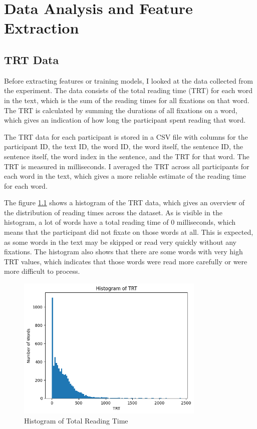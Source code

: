 \chapter{Data Analysis and Feature Extraction}

\section{TRT Data}
Before extracting features or training models, I looked at the data collected from the experiment. The data consists of the total reading time (TRT) for each word in the text, which is the sum of the reading times for all fixations on that word. The TRT is calculated by summing the durations of all fixations on a word, which gives an indication of how long the participant spent reading that word.

The TRT data for each participant is stored in a CSV file with columns for the participant ID, the text ID, the word ID, the word itself, the sentence ID, the sentence itself, the word index in the sentence, and the TRT for that word. The TRT is measured in milliseconds. I averaged the TRT across all participants for each word in the text, which gives a more reliable estimate of the reading time for each word. 

The figure \ref{fig:trt_data} shows a histogram of the TRT data, which gives an overview of the distribution of reading times across the dataset. As is visible in the histogram, a lot of words have a total reading time of 0 milliseconds, which means that the participant did not fixate on those words at all. This is expected, as some words in the text may be skipped or read very quickly without any fixations. The histogram also shows that there are some words with very high TRT values, which indicates that those words were read more carefully or were more difficult to process.

\begin{figure}
    \centering
    \includegraphics[width=0.8\textwidth]{images/TRT_histogram.png}
    \caption{Histogram of Total Reading Time}
    \label{fig:trt_data}
\end{figure}

